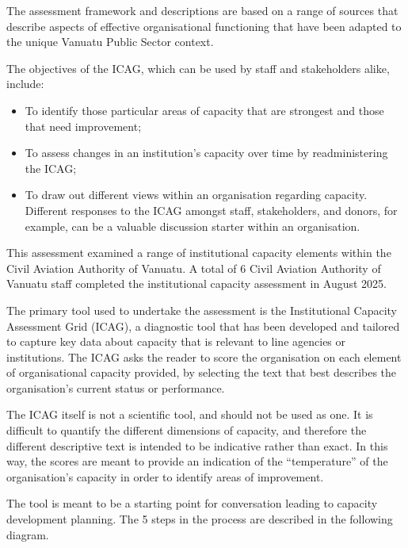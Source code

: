 \documentclass[
  10pt,
]{report}
\providecommand{\tightlist}{%
  \setlength{\itemsep}{0pt}\setlength{\parskip}{0pt}}
\begin{document}
The assessment framework and descriptions are based on a range of
sources that describe aspects of effective organisational functioning
that have been adapted to the unique Vanuatu Public Sector context.

The objectives of the ICAG, which can be used by staff and stakeholders
alike, include:

\begin{itemize}
\tightlist
\item
  To identify those particular areas of capacity that are strongest and
  those that need improvement;
\item
  To assess changes in an institution's capacity over time by
  readministering the ICAG;
\item
  To draw out different views within an organisation regarding capacity.
  Different responses to the ICAG amongst staff, stakeholders, and
  donors, for example, can be a valuable discussion starter within an
  organisation.
\end{itemize}

This assessment examined a range of institutional capacity elements
within the Civil Aviation Authority of Vanuatu. A total of 6 Civil
Aviation Authority of Vanuatu staff completed the institutional capacity
assessment in August 2025.

The primary tool used to undertake the assessment is the Institutional
Capacity Assessment Grid (ICAG), a diagnostic tool that has been
developed and tailored to capture key data about capacity that is
relevant to line agencies or institutions. The ICAG asks the reader to
score the organisation on each element of organisational capacity
provided, by selecting the text that best describes the organisation's
current status or performance.

The ICAG itself is not a scientific tool, and should not be used as one.
It is difficult to quantify the different dimensions of capacity, and
therefore the different descriptive text is intended to be indicative
rather than exact. In this way, the scores are meant to provide an
indication of the ``temperature'' of the organisation's capacity in
order to identify areas of improvement.

The tool is meant to be a starting point for conversation leading to
capacity development planning. The 5 steps in the process are described
in the following diagram.
\end{document}
